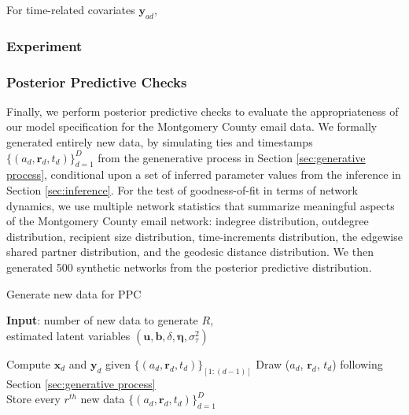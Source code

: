 \documentclass[12pt]{article}
\begin{document}
For time-related covariates $\boldsymbol{y}_{ad}$, 

\subsubsection{Experiment}\label{subsubsec:Experiment_email}
\subsubsection{Posterior Predictive Checks}\label{subsubsec:PPC_email} 	   
 	    	   Finally, we perform posterior predictive checks \cite{rubin1984bayesianly} to evaluate the appropriateness of our model specification for the Montgomery County email data. We formally generated entirely new data, by simulating ties and timestamps $\{(a_{d}, \boldsymbol{r}_{d}, t_{d})\}_{d=1}^D$ from the genenerative process in Section \ref{sec:generative process}, conditional upon a set of inferred parameter values from the inference in Section \ref{sec:inference}. For the test of goodness-of-fit in terms of network dynamics, we use multiple network statistics that summarize meaningful aspects of the Montgomery County email network: indegree distribution, outdegree distribution, recipient size distribution, time-increments distribution, the edgewise shared partner distribution, and the geodesic distance distribution. We then generated 500 synthetic networks from the posterior predictive distribution.
 	    	   \begin{algorithm}[H]
 	    	   	\caption{Generate new data for PPC}
 	    	   	\begin{algorithmic}
 	    	   		\STATE \textbf{Input}: number of new data to generate $R$,\\
 	    	   		estimated latent variables $(\boldsymbol{u}, \boldsymbol{b}, \delta, \boldsymbol{\eta},  \sigma_\tau^2)$\\
 	    	   		\vskip 0.1in
 	    	   		
 	    	   		\STATE  Compute $\boldsymbol{x}_{d}$ and $\boldsymbol{y}_{d}$ given $\{(a_{d}, \boldsymbol{r}_{d}, t_{d})\}_{[1:(d-1)]}$
 	    	   		\STATE	Draw ($a_{d}$, $\boldsymbol{r}_{d}$, $t_{d}$) following Section \ref{sec:generative process}\\
 	    	   		\ENDFOR
 	    	   		\STATE Store every $r^{th}$ new data $\{(a_{d}, \boldsymbol{r}_{d}, t_{d})\}_{d=1}^D$ 
 	    	   		\ENDFOR
 	    	   	\end{algorithmic}
 	    	   \end{algorithm}       
\end{document}
